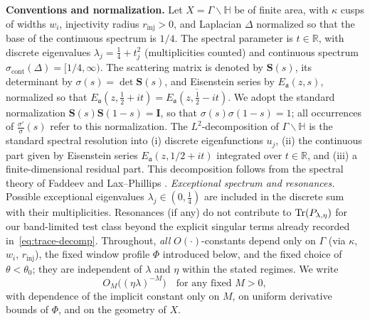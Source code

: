 \medskip
\noindent\textbf{Conventions and normalization.}
Let $X=\Gamma\backslash\mathbb{H}$ be of finite area, with $\kappa$ cusps of widths $w_i$, injectivity radius $r_{\mathrm{inj}}>0$, and Laplacian $\Delta$ normalized so that the base of the continuous spectrum is $1/4$. The spectral parameter is $t\in\mathbb{R}$, with discrete eigenvalues $\lambda_j=\tfrac14+t_j^2$ (multiplicities counted) and continuous spectrum $\sigma_{\mathrm{cont}}(\Delta)=[1/4,\infty)$. The scattering matrix is denoted by $\mathbf{S}(s)$, its determinant by $\sigma(s)=\det\mathbf{S}(s)$, and Eisenstein series by $E_\mathfrak{a}(z,s)$, normalized so that $E_\mathfrak{a}(z,\tfrac12+it)=\overline{E_\mathfrak{a}(z,\tfrac12-it)}$. We adopt the standard normalization $\mathbf{S}(s)\mathbf{S}(1-s)=\mathbf{I}$, so that $\sigma(s)\sigma(1-s)=1$; all occurrences of $\frac{\sigma'}{\sigma}(s)$ refer to this normalization. The $L^2$-decomposition of $\Gamma\backslash\mathbb{H}$ is the standard spectral resolution into (i) discrete eigenfunctions $u_j$, (ii) the continuous part given by Eisenstein series $E_\mathfrak{a}(z,1/2+it)$ integrated over $t\in\mathbb{R}$, and (iii) a finite-dimensional residual part. This decomposition follows from the spectral theory of Faddeev \cite{Faddeev1967} and Lax--Phillips \cite{LaxPhillips1976}. \emph{Exceptional spectrum and resonances.} Possible exceptional eigenvalues $\lambda_j\in(0,\tfrac14)$ are included in the discrete sum with their multiplicities. Resonances (if any) do not contribute to $\operatorname{Tr}(P_{\lambda,\eta})$ for our band-limited test class beyond the explicit singular terms already recorded in~\eqref{eq:trace-decomp}. Throughout, \emph{all} $O(\cdot)$-constants depend only on $\Gamma$ (via $\kappa$, ${w_i}$, $r_{\mathrm{inj}}$), the fixed window profile $\Phi$ introduced below, and the fixed choice of $\theta<\theta_0$; they are independent of $\lambda$ and $\eta$ within the stated regimes. We write
\[
O_M\!\big((\eta\lambda)^{-M}\big)\quad\text{for any fixed }M>0,
\]
with dependence of the implicit constant only on $M$, on uniform derivative bounds of $\Phi$, and on the geometry of $X$.

